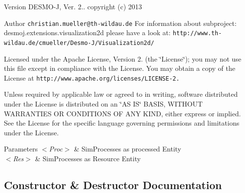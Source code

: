 \begin{DoxyVersion}{Version}
D\-E\-S\-M\-O-\/\-J, Ver. 2.. copyright (c) 2013 
\end{DoxyVersion}
\begin{DoxyAuthor}{Author}
{\tt christian.\-mueller@th-\/wildau.\-de} For information about subproject\-: desmoj.\-extensions.\-visualization2d please have a look at\-: {\tt http\-://www.\-th-\/wildau.\-de/cmueller/\-Desmo-\/\-J/\-Visualization2d/}
\end{DoxyAuthor}
Licensed under the Apache License, Version 2. (the \char`\"{}\-License\char`\"{}); you may not use this file except in compliance with the License. You may obtain a copy of the License at {\tt http\-://www.\-apache.\-org/licenses/\-L\-I\-C\-E\-N\-S\-E-\/2.}

Unless required by applicable law or agreed to in writing, software distributed under the License is distributed on an \char`\"{}\-A\-S I\-S\char`\"{} B\-A\-S\-I\-S, W\-I\-T\-H\-O\-U\-T W\-A\-R\-R\-A\-N\-T\-I\-E\-S O\-R C\-O\-N\-D\-I\-T\-I\-O\-N\-S O\-F A\-N\-Y K\-I\-N\-D, either express or implied. See the License for the specific language governing permissions and limitations under the License.


\begin{DoxyParams}{Parameters}
{\em $<$\-Proc$>$} & Sim\-Processes as processed Entity \\
\hline
{\em $<$\-Res$>$} & Sim\-Processes as Resource Entity \\
\hline
\end{DoxyParams}


\subsection{Constructor \& Destructor Documentation}
